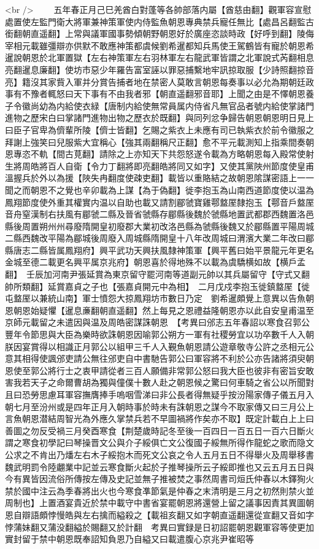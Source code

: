 <br />
　　五年春正月己巳羌酋白對蓬等各帥部落内屬【酋慈由翻】觀軍容宣慰處置使左監門衛大將軍兼神策軍使内侍監魚朝恩專典禁兵寵任無比【處昌呂翻監古銜翻朝直遥翻】上常與議軍國事勢傾朝野朝恩好於廣座恣談時政【好呼到翻】陵侮宰相元載雖彊辯亦供默不敢應神策都虞候劉希暹都知兵馬使王駕鶴皆有寵於朝恩希暹說朝恩於北軍置獄【左右神策軍左右羽林軍左右龍武軍皆謂之北軍說式芮翻相息亮翻暹息廉翻】使坊市惡少年羅告富室誣以罪惡捕繫地牢訊掠取服【少詩照翻掠音亮】籍沒其家貲入軍并分賞告捕者地在禁密人莫敢言朝恩每奏事以必允為期朝廷政事有不豫者輒怒曰天下事有不由我者邪【朝直遥翻邪音耶】上聞之由是不懌朝恩養子令徽尚幼為内給使衣緑【唐制内給使無常員属内侍省凡無官品者號内給使掌諸門進物之歷宋白曰掌諸門進物出物之歷衣於既翻】與同列忿争歸告朝恩朝恩明日見上曰臣子官卑為儕輩所陵【儕士皆翻】乞賜之紫衣上未應有司已執紫衣於前令徽服之拜謝上強笑曰兒服紫大宜稱心【強其兩翻稱尺正翻】愈不平元載測知上指乘間奏朝恩專恣不軌【間古莧翻】請除之上亦知天下共怨怒遂令載為方略朝恩每入殿常使射生將周皓將百人自衛【令力丁翻將即亮翻皓將同又如字】又使其黨陜州節度使皇甫溫握兵於外以為援【陜失冉翻度使疎吏翻】載皆以重賂結之故朝恩隂謀密語上一一聞之而朝恩不之覺也辛卯載為上謀【為于偽翻】徙李抱玉為山南西道節度使以温為鳳翔節度使外重其權實内温以自助也載又請割郿虢寶雞鄠盩厔隸抱玉【鄠音戶盩厔音舟窒漢制右扶風有郿虢二縣及晉省虢縣存郿縣後魏於虢縣地置武都郡西魏置洛邑縣後周置朔州州尋廢隋開皇初廢郡大業初改洛邑縣為虢縣後魏又於郿縣置平陽周城二縣西魏改平陽為郿城後周廢入周城縣隋開皇十八年改周城曰渭濱大業二年改曰郿縣唐志二縣皆属鳳翔府】興平武功天興扶風隸神策軍【興平舊曰始平景龍元年更名金城至德二載更名興平属京兆府】朝恩喜於得地殊不以載為虞驕横如故【横戶孟翻】　壬辰加河南尹張延賞為東京留守罷河南等道副元帥以其兵屬留守【守式又翻帥所類翻】延賞嘉貞之子也【張嘉貞開元中為相】　二月戊戍李抱玉徙鎮盩厔【徙屯盩厔以兼統山南】軍士憤怨大掠鳳翔坊市數日乃定　劉希暹頗覺上意異以告魚朝恩朝恩始疑懼【暹息亷翻朝直遥翻】然上每見之恩禮益隆朝恩亦以此自安皇甫温至京師元載留之未遣因與温及周皓密謀誅朝恩　【考異曰邠志五年春詔以寒食召郭公豐年令節思與大臣為樂時欲誅朝恩因喻郭公朔方一軍有社稷勞宜以功卒數千人入朝朕因宴賞得以相識正月郭公以組甲三千人入覲魚朝恩請公遊章敬寺公許之丞相元公意其相得使諷邠吏請公無往邠吏自中書馳告郭公曰軍容將不利於公亦告諸將須臾朝恩使至郭公將行士之衷甲請從者三百人願備非常郭公怒曰我大臣也彼非有密旨安敢害我若天子之命爾曹胡為獨與僮僕十數人赴之朝恩候之驚曰何車騎之省公以所聞對且曰恐勞思慮耳軍容撫膺捧手嗚咽雪涕曰非公長者得無疑乎按汾陽家傳子儀五月入朝七月至汾州或是四年正月入朝時事於時未有誅朝恩之謀今不取家傳又曰三月公上言魚朝恩潜結周智光為外應久掌禁兵若不早圖禍將作矣亦不取】既定計載白上上曰善圖之勿反受禍三月癸酉寒食【荆楚歲時記冬至後一百四日一百五日一百六日斷火謂之寒食初學記曰琴操晋文公與介子綏俱亡文公復國子綏無所得作龍蛇之歌而隐文公求之不肯出乃燔左右木子綏抱木而死文公哀之令人五月五日不得舉火及周舉移書魏武明罰令陸翽業中記並云寒食斷火起於子推琴操所云子綏即推也又云五月五日與今有異皆因流俗所傳按左傳及史記並無子推被焚之事然周書司烜氏仲春以木鐸狥火禁於國中注云為季春將出火也今寒食凖節氣是仲春之末清明是三月之初然則禁火並周制也】上置酒宴貴近於禁中載守中書省宴罷朝恩將還營上留之議事因責其異圖朝恩自辯語頗悖慢皓與左右擒而縊殺之【載祖亥翻又如字朝直遥翻還從宣翻又音如字悖蒲妹翻又蒲没翻縊於賜翻又於計翻　考異曰實録是日初詔罷朝恩觀軍容等使更加實封留于禁中朝恩既奉詔知負恩乃自縊又曰載遣腹心京兆尹崔昭等